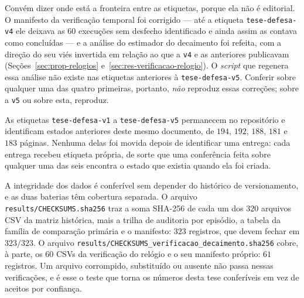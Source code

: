 Convém dizer onde está a fronteira entre as etiquetas, porque ela não é editorial. O
manifesto da verificação temporal foi corrigido --- até a etiqueta
\texttt{tese-defesa-v4} ele deixava as $60$ execuções sem desfecho identificado e ainda
assim as contava como concluídas --- e a análise do estimador do decaimento foi
refeita, com a direção do seu viés invertida em relação ao que a \texttt{v4} e as
anteriores publicavam (Seções~\ref{sec:prop-relogios}
e~\ref{sec:res-verificacao-relogio}). O
\textit{script} que regenera essa análise não existe nas etiquetas anteriores à
\texttt{tese-defesa-v5}. Conferir sobre qualquer uma das quatro primeiras, portanto,
\emph{não} reproduz essas correções; sobre a \texttt{v5} ou sobre esta, reproduz.

As etiquetas \texttt{tese-defesa-v1} a \texttt{tese-defesa-v5} permanecem no
repositório e identificam estados anteriores deste mesmo documento, de $194$, $192$,
$188$, $181$ e $183$ páginas. Nenhuma delas foi movida depois de identificar uma
entrega: cada entrega recebeu etiqueta própria, de sorte que uma conferência feita
sobre qualquer uma das seis encontra o estado que existia quando ela foi criada.

A integridade dos dados é conferível sem depender do histórico de versionamento, e as
duas baterias têm cobertura separada. O arquivo \texttt{results/CHECKSUMS.sha256} traz a
soma SHA-256 de cada um dos $320$ arquivos CSV da matriz histórica, mais a trilha de
auditoria por episódio, a tabela da família de comparação primária e o manifesto:
$323$ registros, que devem fechar em $323/323$. O arquivo
\texttt{results/\allowbreak CHECKSUMS\_\allowbreak verificacao\_\allowbreak decaimento.sha256} cobre, à parte, os $60$ CSVs
da verificação do relógio e o seu manifesto próprio: $61$ registros. Um arquivo
corrompido, substituído ou ausente não passa nessas verificações, e é esse o teste que
torna os números desta tese conferíveis em vez de aceitos por confiança.

